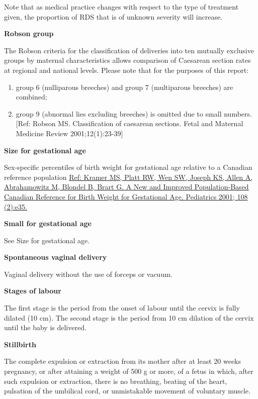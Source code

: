 \documentclass[
]{krantz}
\providecommand{\tightlist}{%
  \setlength{\itemsep}{0pt}\setlength{\parskip}{0pt}}
\begin{document}
Note that as medical practice changes with respect to the type of treatment given, the proportion of RDS that is of unknown severity will increase.

\textbf{Robson group}

The Robson criteria for the classification of deliveries into ten mutually exclusive groups by maternal characteristics allows comparison of Caesarean section rates at regional and national levels. Please note that for the purposes of this report:

\begin{enumerate}
\def\labelenumi{\arabic{enumi}.}
\tightlist
\item
  group 6 (nulliparous breeches) and group 7 (multiparous breeches) are combined;
\item
  group 9 (abnormal lies excluding breeches) is omitted due to small numbers. {[}Ref: Robson MS. Classification of caesarean sections. Fetal and Maternal Medicine Review 2001;12(1):23-39{]}
\end{enumerate}

\textbf{Size for gestational age}

Sex-specific percentiles of birth weight for gestational age relative to a Canadian reference population \href{http://pediatrics.aappublications.org/content/108/2/e35.full.html}{Ref: Kramer MS, Platt RW, Wen SW, Joseph KS, Allen A, Abrahamowitz M, Blondel B, Brart G. A New and Improved Population-Based Canadian Reference for Birth Weight for Gestational Age. Pediatrics 2001; 108 (2):e35.}

\textbf{Small for gestational age}

See Size for gestational age.

\textbf{Spontaneous vaginal delivery}

Vaginal delivery without the use of forceps or vacuum.

\textbf{Stages of labour}

The first stage is the period from the onset of labour until the cervix is fully dilated (10 cm). The second stage is the period from 10 cm dilation of the cervix until the baby is delivered.

\textbf{Stillbirth}

The complete expulsion or extraction from its mother after at least 20 weeks pregnancy, or after attaining a weight of 500 g or more, of a fetus in which, after such expulsion or extraction, there is no breathing, beating of the heart, pulsation of the umbilical cord, or unmistakable movement of voluntary muscle.
\end{document}
